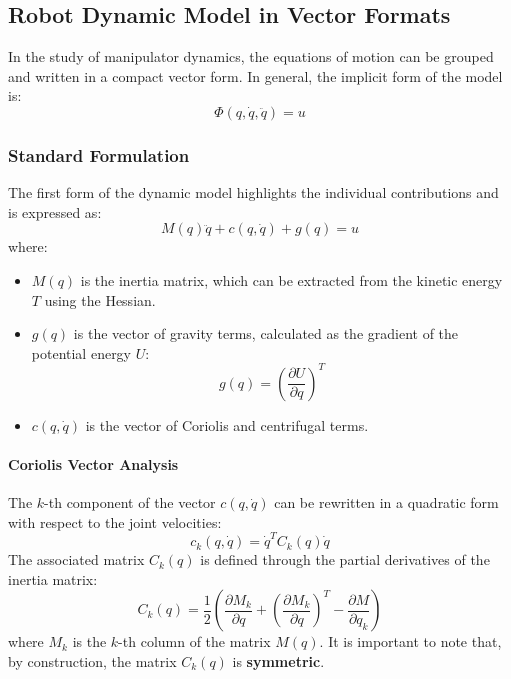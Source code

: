 \documentclass[11pt,a4paper]{article}
\begin{document}
\subsection{Robot Dynamic Model in Vector Formats}

In the study of manipulator dynamics, the equations of motion can be grouped and written in a compact vector form. In general, the implicit form of the model is:
\begin{equation}
    \Phi(q, \dot{q}, \ddot{q}) = u
\end{equation}

\subsubsection{Standard Formulation}
The first form of the dynamic model highlights the individual contributions and is expressed as:
\begin{equation}
    M(q)\ddot{q} + c(q, \dot{q}) + g(q) = u
\end{equation}
where:
\begin{itemize}
    \item $M(q)$ is the inertia matrix, which can be extracted from the kinetic energy $T$ using the Hessian.
    \item $g(q)$ is the vector of gravity terms, calculated as the gradient of the potential energy $U$:
    \begin{equation}
        g(q) = \left( \frac{\partial U}{\partial q} \right)^T
    \end{equation}
    \item $c(q, \dot{q})$ is the vector of Coriolis and centrifugal terms.
\end{itemize}

\paragraph{Coriolis Vector Analysis}
The $k$-th component of the vector $c(q, \dot{q})$ can be rewritten in a quadratic form with respect to the joint velocities:
\begin{equation}
    c_k(q, \dot{q}) = \dot{q}^T C_k(q) \dot{q}
\end{equation}
The associated matrix $C_k(q)$ is defined through the partial derivatives of the inertia matrix:
\begin{equation}
    C_k(q) = \frac{1}{2} \left( \frac{\partial M_k}{\partial q} + \left( \frac{\partial M_k}{\partial q} \right)^T - \frac{\partial M}{\partial q_k} \right)
\end{equation}
where $M_k$ is the $k$-th column of the matrix $M(q)$. It is important to note that, by construction, the matrix $C_k(q)$ is \textbf{symmetric}.
\end{document}
